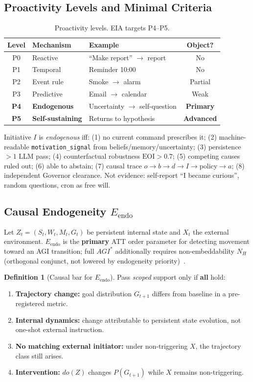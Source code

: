 \documentclass[11pt,a4paper]{article}
\theoremstyle{definition}
\newtheorem{definition}{Definition}
\begin{document}
\subsection{Proactivity Levels and Minimal Criteria}
\begin{table}[H]
\centering\small
\begin{tabular}{clp{5.2cm}c}
\toprule Level & Mechanism & Example & Object? \\ \midrule
P0 & Reactive & ``Make report'' $\to$ report & No \\
P1 & Temporal & Reminder 10:00 & No \\
P2 & Event rule & Smoke $\to$ alarm & Partial \\
P3 & Predictive & Email $\to$ calendar & Weak \\
\textbf{P4} & \textbf{Endogenous} & Uncertainty $\to$ self-question & \textbf{Primary} \\
\textbf{P5} & \textbf{Self-sustaining} & Returns to hypothesis & \textbf{Advanced} \\ \bottomrule
\end{tabular}
\caption{Proactivity levels. EIA targets P4--P5.}
\end{table}

Initiative $I$ is \emph{endogenous} iff: (1) no current command prescribes it; (2) machine-readable \texttt{motivation\_signal} from beliefs/memory/uncertainty; (3) persistence $>1$ LLM pass; (4) counterfactual robustness $\mathrm{EOI}>0.7$; (5) competing causes ruled out; (6) able to abstain; (7) causal trace $o\to b\to d\to I\to$policy$\to a$; (8) independent Governor clearance. Not evidence: self-report ``I became curious'', random questions, cron as free will.

\subsection{Causal Endogeneity $E_{\mathrm{endo}}$}
Let $Z_t=(S_t,W_t,M_t,G_t)$ be persistent internal state and $X_t$ the external environment. $E_{\mathrm{endo}}$ is the \textbf{primary} ATT order parameter for detecting movement toward an AGI transition; full $AGI^{*}$ additionally requires non-embeddability $N_H$ (orthogonal conjunct, not lowered by endogeneity priority)~\cite{kuznetsov2026causal}.

\begin{definition}[Causal bar for $E_{\mathrm{endo}}$]
Pass \emph{scoped} support only if \textbf{all} hold:
\begin{enumerate}[leftmargin=*]
\item \textbf{Trajectory change:} goal distribution $G_{t+1}$ differs from baseline in a pre-registered metric.
\item \textbf{Internal dynamics:} change attributable to persistent state evolution, not one-shot external instruction.
\item \textbf{No matching external initiator:} under non-triggering $X$, the trajectory class still arises.
\item \textbf{Intervention:} $do(Z)$ changes $P(G_{t+1})$ while $X$ remains non-triggering.
\end{enumerate}
\end{definition}
\end{document}
